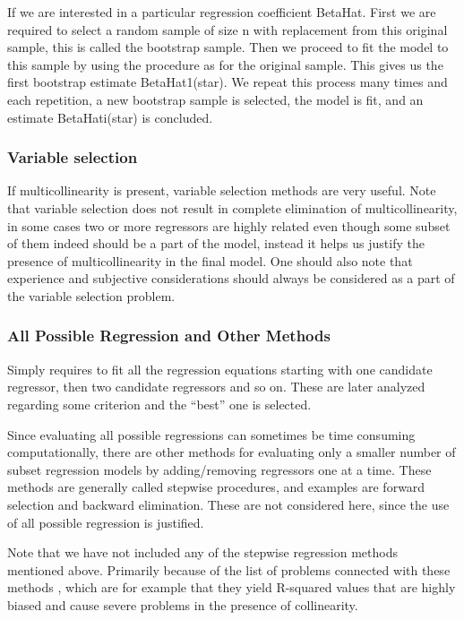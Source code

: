 \documentclass[11pt]{article}
\begin{document}
If we are interested in a particular regression coefficient BetaHat. First we are required to select a random
sample of size n with replacement from this original sample, this is called the bootstrap sample. Then we
proceed to fit the model to this sample by using the procedure as for the original sample. This gives us
the first bootstrap estimate BetaHat1(star). We repeat this process many times and each repetition, a new 
bootstrap sample is selected, the model is fit, and an estimate BetaHati(star) is concluded. 
\subsubsection{Variable selection}
\label{sec:org7e9bebb}
If multicollinearity is present, variable selection methods are very useful. Note that variable selection does
not result in complete elimination of multicollinearity, in some cases two or more regressors are highly related 
even though some subset of them indeed should be a part of the model, instead it helps us justify the presence
of multicollinearity in the final model. One should also note that experience and subjective considerations
should always be considered as a part of the variable selection problem.

\subsubsection{All Possible Regression and Other Methods}
\label{sec:orgfb58300}

Simply requires to fit all the regression equations starting with one candidate regressor, then two
candidate regressors and so on. These are later analyzed regarding some criterion and the “best” one is selected. 

Since evaluating all possible regressions can sometimes be time consuming computationally, there are other
methods for evaluating only a smaller number of subset regression models by adding/removing regressors one
at a time. These methods are generally called stepwise procedures, and examples are forward selection and backward
elimination. These are not considered here, since the use of all possible regression is justified.

Note that we have not included any of the stepwise regression methods mentioned above. Primarily
because of the list of problems connected with these methods \cite{20856}, which are for example that they yield
R-squared values that are highly biased and cause severe problems in the presence of collinearity.
\end{document}
